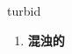 
\begin{frame}
{\huge turbid}
\begin{center}
\begin{enumerate}\Large
  \item \textbf{混浊的}
\end{enumerate}
\end{center}
\end{frame}
